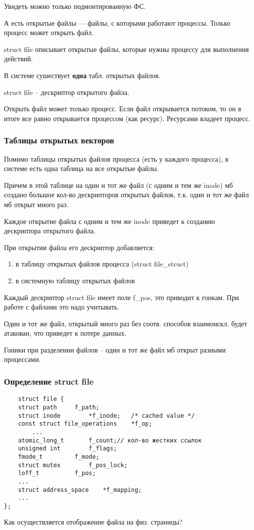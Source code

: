 Увидеть можно только подмонтированную ФС.

А есть открытые файлы --- файлы, с которыми работают процессы. Только процесс может открыть файл.

struct file описывает открытые файлы, которые нужны процессу для выполнения действий.

В системе сушествует \textbf{одна} табл. открытых файлов.

struct file -- дескриптор открытого файла.

Открыть файл может только процесс. Если файл открывается потоком, то он в итоге все равно открывается процессом (как ресурс). Ресурсами владеет процесс.


\subsubsection{Таблицы открытых векторов}

Помимо таблицы открытых файлов процесса (есть у каждого процесса), в системе есть одна таблица на все открытые файлы.

Причем в этой таблице на один и тот же файл (с одним и тем же inode) мб создано большое кол-во дескрипторов открытых файлов, т.к. один и тот же файл мб открыт много раз. 

Каждое открытие файла с одним и тем же inode приведет к созданию дескриптора открытого файла.

При открытии файла его дескриптор добавляется:
\begin{enumerate}
    \item в таблицу открытых файлов процесса (struct file\_struct)
    \item в системную таблицу открытых файлов
\end{enumerate}

Каждый дескриптор struct file имеет поле f\_pos, это приводит к гонкам. При работе с файлами это надо учитывать.

Один и тот же файл, открытый много раз без соотв. способов взаимоискл. будет атакован, что приведет к потере данных.

Гоники при разделении файлов -- один и тот же файл мб открыт разными процессами.

\subsubsection{Определение struct file}
\begin{lstlisting}
    struct file {
	struct path		f_path;
	struct inode		*f_inode;	/* cached value */
	const struct file_operations	*f_op;
        ...
	atomic_long_t		f_count;// кол-во жестких ссылок
	unsigned int 		f_flags;
	fmode_t			f_mode;
	struct mutex		f_pos_lock;
	loff_t			f_pos;
	...
	struct address_space	*f_mapping;
	...
};
\end{lstlisting}
Как осуществляется отображение файла на физ. страницы?

